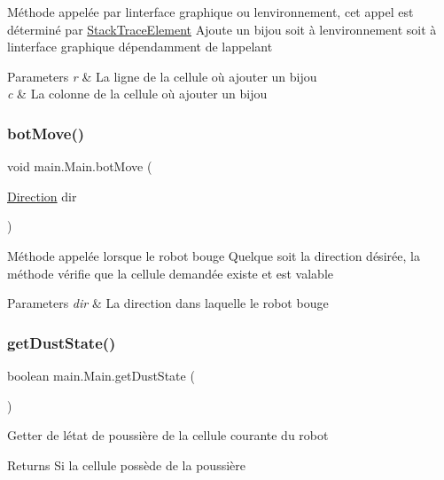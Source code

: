 Méthode appelée par l\textquotesingle{}interface graphique ou l\textquotesingle{}environnement, cet appel est déterminé par \hyperlink{}{Stack\+Trace\+Element} Ajoute un bijou soit à l\textquotesingle{}environnement soit à l\textquotesingle{}interface graphique dépendamment de l\textquotesingle{}appelant 
\begin{DoxyParams}{Parameters}
{\em r} & La ligne de la cellule où ajouter un bijou \\
\hline
{\em c} & La colonne de la cellule où ajouter un bijou \\
\hline
\end{DoxyParams}
\hypertarget{classmain_1_1_main_a79f1b4e1ccb0a641c1d36973af32eca1}{}\label{classmain_1_1_main_a79f1b4e1ccb0a641c1d36973af32eca1} 
\subsubsection{\texorpdfstring{bot\+Move()}{botMove()}}
{\footnotesize\ttfamily void main.\+Main.\+bot\+Move (\begin{DoxyParamCaption}\item[{\hyperlink{enum_i_a_1_1_direction}{Direction}}]{dir }\end{DoxyParamCaption})}

Méthode appelée lorsque le robot bouge Quelque soit la direction désirée, la méthode vérifie que la cellule demandée existe et est valable 
\begin{DoxyParams}{Parameters}
{\em dir} & La direction dans laquelle le robot bouge \\
\hline
\end{DoxyParams}
\hypertarget{classmain_1_1_main_a791b90bdd63a0a13054f10b7f4b4e27f}{}\label{classmain_1_1_main_a791b90bdd63a0a13054f10b7f4b4e27f} 
\subsubsection{\texorpdfstring{get\+Dust\+State()}{getDustState()}}
{\footnotesize\ttfamily boolean main.\+Main.\+get\+Dust\+State (\begin{DoxyParamCaption}{ }\end{DoxyParamCaption})}

Getter de l\textquotesingle{}état de poussière de la cellule courante du robot \begin{DoxyReturn}{Returns}
Si la cellule possède de la poussière 
\end{DoxyReturn}
\hypertarget{classmain_1_1_main_a701386aa685b5e10807def95e010d915}{}\label{classmain_1_1_main_a701386aa685b5e10807def95e010d915} 
